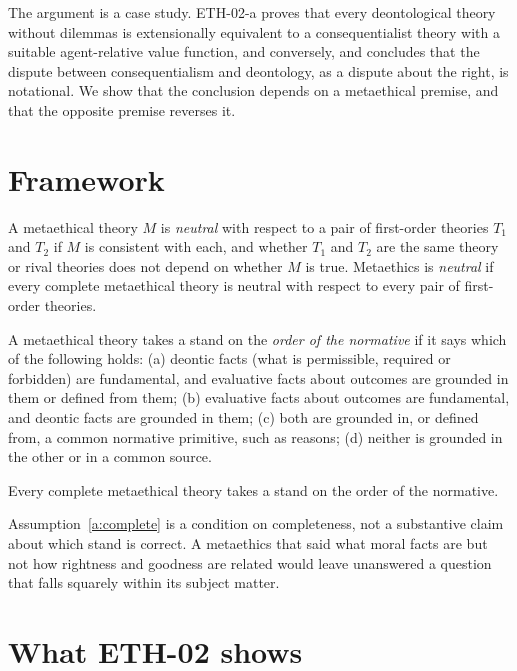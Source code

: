 \documentclass{situationist-preprint}
\begin{document}
The argument is a case study. ETH-02-a proves that every deontological theory without dilemmas is extensionally equivalent to a consequentialist theory with a suitable agent-relative value function, and conversely, and concludes that the dispute between consequentialism and deontology, as a dispute about the right, is notational. We show that the conclusion depends on a metaethical premise, and that the opposite premise reverses it.

\section{Framework}

\begin{definition}\label{d:neutral}
A metaethical theory $M$ is \emph{neutral} with respect to a pair of first-order theories $T_1$ and $T_2$ if $M$ is consistent with each, and whether $T_1$ and $T_2$ are the same theory or rival theories does not depend on whether $M$ is true. Metaethics is \emph{neutral} if every complete metaethical theory is neutral with respect to every pair of first-order theories.
\end{definition}

\begin{definition}\label{d:structure}
A metaethical theory takes a stand on the \emph{order of the normative} if it says which of the following holds: (a) deontic facts (what is permissible, required or forbidden) are fundamental, and evaluative facts about outcomes are grounded in them or defined from them; (b) evaluative facts about outcomes are fundamental, and deontic facts are grounded in them; (c) both are grounded in, or defined from, a common normative primitive, such as reasons; (d) neither is grounded in the other or in a common source.
\end{definition}

\begin{assumption}\label{a:complete}
Every complete metaethical theory takes a stand on the order of the normative.
\end{assumption}

Assumption~\ref{a:complete} is a condition on completeness, not a substantive claim about which stand is correct. A metaethics that said what moral facts are but not how rightness and goodness are related would leave unanswered a question that falls squarely within its subject matter.

\section{What ETH-02 shows}
\end{document}
